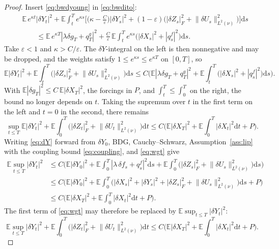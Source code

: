 \documentclass[preprint,12pt]{elsarticle}
\newcommand{\E}{\mathbb{E}}
\newcommand{\diff}{\mathrm{d}}
\newcommand{\Lnu}{L^2(\nu)}
\newcommand{\Lnorm}[1]{\lVert #1\rVert_{\Lnu}}
\numberwithin{equation}{section}
\theoremstyle{plain}
\theoremstyle{definition}
\theoremstyle{\PaperRemarkStyle}
\begin{document}
\begin{proof}
Insert \eqref{eq:bwdyoung} in \eqref{eq:bwdito}:
\[
\begin{aligned}
&\E\,e^{\kappa t}|\delta Y_t|^2
+\E\!\int_t^T\!e^{\kappa s}\Big[\big(\kappa-\tfrac{C}{\varepsilon}\big)|\delta Y_s|^2
+(1-\varepsilon)\big(|\delta Z_s|_F^2+\Lnorm{\delta U_s}^2\big)\Big]\diff s\\
&\qquad\le\E\,e^{\kappa T}|\lambda\delta g_T+q^g_T|^2
+\tfrac{C}{\varepsilon}\,\E\!\int_t^T\!e^{\kappa s}\big(|\delta X_s|^2+|q^f_s|^2\big)\diff s .
\end{aligned}
\]
Take $\varepsilon<1$ and $\kappa>C/\varepsilon$. The $\delta Y$-integral on the left is then
nonnegative and may be dropped, and the weights satisfy $1\le e^{\kappa s}\le e^{\kappa T}$
on $[0,T]$, so
\[
\E|\delta Y_t|^2+\E\!\int_t^T\!\big(|\delta Z_s|_F^2+\Lnorm{\delta U_s}^2\big)\diff s
\le C\Big(\E|\lambda\delta g_T+q^g_T|^2
+\E\!\int_t^T\!\big(|\delta X_s|^2+|q^f_s|^2\big)\diff s\Big).
\]
With $\E|\delta g_T|^2\le C\,\E|\delta X_T|^2$, the forcings in $P$, and
$\int_t^T\le\int_0^T$ on the right, the bound no longer depends on $t$. Taking the
supremum over $t$ in the first term on the left and $t=0$ in the second, there remains
\begin{equation}\label{eq:wgt}
\sup_{t\le T}\E|\delta Y_t|^2
+\E\!\int_0^T\!\big(|\delta Z_t|_F^2+\Lnorm{\delta U_t}^2\big)\diff t
\le C\Big(\E|\delta X_T|^2+\E\!\int_0^T\!|\delta X_t|^2\diff t+P\Big).
\end{equation}
Writing \eqref{eq:dY} forward from $\delta Y_0$, BDG, Cauchy--Schwarz,
Assumption~\ref{ass:lip} with the coupling bound \eqref{eq:coupling}, and \eqref{eq:wgt} give
\[
\begin{aligned}
\E\sup_{t\le T}|\delta Y_t|^2
&\le C\Big(\E|\delta Y_0|^2+\E\!\int_0^T\!|\lambda\,\delta f_s+q^f_s|^2\diff s
+\E\!\int_0^T\!\big(|\delta Z_s|_F^2+\Lnorm{\delta U_s}^2\big)\diff s\Big)\\
&\le C\Big(\E|\delta Y_0|^2
+\E\!\int_0^T\!\big(|\delta X_s|^2+|\delta Y_s|^2+|\delta Z_s|_F^2+\Lnorm{\delta U_s}^2\big)\diff s+P\Big)\\
&\le C\Big(\E|\delta X_T|^2+\E\!\int_0^T\!|\delta X_t|^2\diff t+P\Big) .
\end{aligned}
\]
The first term of \eqref{eq:wgt} may therefore be replaced by
$\E\sup_{t\le T}|\delta Y_t|^2$:
\begin{equation}\label{eq:bwd}
\E\sup_{t\le T}|\delta Y_t|^2+\E\!\int_0^T\!\big(|\delta Z_t|_F^2+\Lnorm{\delta U_t}^2\big)\diff t
\le C\Big(\E|\delta X_T|^2+\E\!\int_0^T\!|\delta X_t|^2\diff t+P\Big).
\end{equation}


\end{proof}
\end{document}
